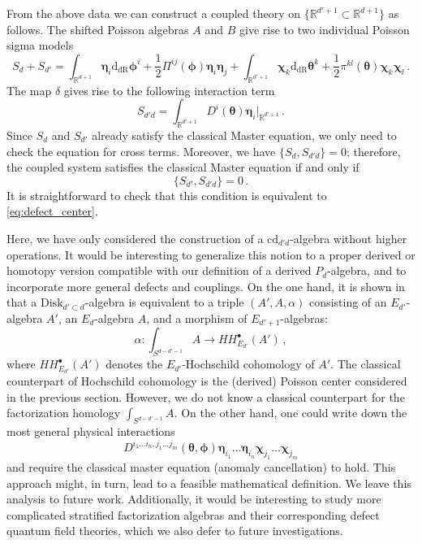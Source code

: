 \documentclass[11pt]{article}
\newcommand{\R}{\mathbb{R}}
\newcommand{\derham}{\mathrm{dR}}
\numberwithin{equation}{section}
\begin{document}
From the above data we can construct a coupled theory on $\{\R^{d'+1}\subset \R^{d+1}\}$ as follows. The shifted Poisson algebras $A$ and $B$ give rise to two individual Poisson sigma models
\begin{equation}
	S_d + S_{d'} = \int_{\R^{d+1}}\boldsymbol{\eta}_i\mathrm{d}_{\derham} \boldsymbol{\phi}^i + \frac{1}{2}\Pi^{ij}(\boldsymbol{\phi})\boldsymbol{\eta}_i\boldsymbol{\eta}_j + \int_{\R^{d'+1}}\boldsymbol{\chi}_k\mathrm{d}_{\derham} \boldsymbol{\theta}^k + \frac{1}{2}\pi^{kl}(\boldsymbol{\theta})\boldsymbol{\chi}_k\boldsymbol{\chi}_l\,.
\end{equation}
The map $\delta$ gives rise to the following interaction term
\begin{equation}
	\label{eq:ex_defect_coup}
S_{d'd} = \int_{\R^{d'+1}} D^i(\boldsymbol{\theta})\boldsymbol{\eta}_i|_{\R^{d'+1}}\,.
\end{equation}
Since $S_d$ and $S_{d'}$ already satisfy the classical Master equation, we only need to check the equation for cross terms. Moreover, we have $\{S_d,S_{d'd}\} = 0$; therefore, the coupled system satisfies the classical Master equation if and only if
\begin{equation}
 \{S_{d'},S_{d'd}\} = 0\,.
\end{equation}
It is straightforward to check that this condition is equivalent to \eqref{eq:defect_center}. 

Here, we have only considered the construction of a $\mathrm{cd}_{d'd}$-algebra without higher operations. It would be interesting to generalize this notion to a proper derived or homotopy version compatible with our definition of a derived $P_d$-algebra, and to incorporate more general defects and couplings. On the one hand, it is shown in \cite{ayala2017factorization} that a $\mathrm{Disk}_{d'\subset d}$-algebra is equivalent to a triple $(A', A, \alpha)$ consisting of an $E_{d'}$-algebra $A'$, an $E_d$-algebra $A$, and a morphism of $E_{d'+1}$-algebras:
\begin{equation}
	\alpha: \int_{S^{d-d'-1}} A \to HH^{\bullet}_{E_{d'}}(A')\,,
\end{equation}
where $HH^{\bullet}_{E_{d'}}(A')$ denotes the $E_{d'}$-Hochschild cohomology of $A'$. The classical counterpart of Hochschild cohomology is the (derived) Poisson center considered in the previous section. However, we do not know a classical counterpart for the factorization homology $\int_{S^{d-d'-1}} A$. On the other hand, one could write down the most general physical interactions 
\begin{equation}
	D^{i_1\dots i_n,j_1\dots j_m}(\boldsymbol{\theta}, \boldsymbol{\phi})\boldsymbol{\eta}_{i_1}\dots \boldsymbol{\eta}_{i_n}\boldsymbol{\chi}_{j_1}\dots \boldsymbol{\chi}_{j_m}
\end{equation}
and require the classical master equation (anomaly cancellation) to hold. This approach might, in turn, lead to a feasible mathematical definition. We leave this analysis to future work. Additionally, it would be interesting to study more complicated stratified factorization algebras and their corresponding defect quantum field theories, which we also defer to future investigations.
\end{document}

